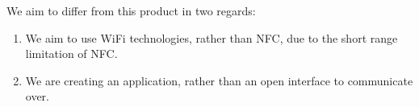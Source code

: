 \documentclass[10pt]{article}
\begin{document}
We aim to differ from this product in two regards:
\begin{enumerate}
    \item We aim to use WiFi technologies, rather than NFC, due to the short range limitation of NFC.
    \item We are creating an application, rather than an open interface to communicate over.
\end{enumerate}

\newpage
\end{document}
